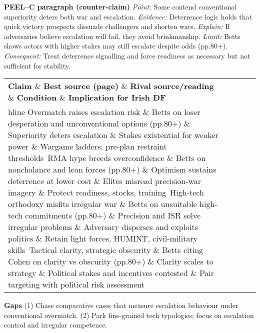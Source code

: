 \textbf{PEEL–C paragraph (counter-claim)}
\textit{Point:} Some contend conventional superiority deters both war and escalation.
\textit{Evidence:} Deterrence logic holds that quick victory prospects dissuade challengers and shorten wars.
\textit{Explain:} If adversaries believe escalation will fail, they avoid brinkmanship.
\textit{Limit:} Betts shows actors with higher stakes may still escalate despite odds (pp.80+).
\textit{Consequent:} Treat deterrence signalling and force readiness as necessary but not sufficient for stability.

  
\begin{tabular}{p{3.2cm}p{4.2cm}p{3.6cm}p{3.2cm}p{4.2cm}}
	\textbf{Claim} \& \textbf{Best source (page)} \& \textbf{Rival source/reading} \& \textbf{Condition} \& \textbf{Implication for Irish DF}\\hline
	Overmatch raises escalation risk \& Betts on loser desperation and unconventional options (pp.80+) \& Superiority deters escalation \& Stakes existential for weaker power \& Wargame ladders; pre-plan restraint thresholds\
	RMA hype breeds overconfidence \& Betts on nonchalance and lean forces (pp.80+) \& Optimism sustains deterrence at lower cost \& Elites misread precision-war imagery \& Protect readiness, stocks, training\
	High-tech orthodoxy misfits irregular war \& Betts on unsuitable high-tech commitments (pp.80+) \& Precision and ISR solve irregular problems \& Adversary disperses and exploits politics \& Retain light forces, HUMINT, civil-military skills\
	Tactical clarity, strategic obscurity \& Betts citing Cohen on clarity vs obscurity (pp.80+) \& Clarity scales to strategy \& Political stakes and incentives contested \& Pair targeting with political risk assessment\
\end{tabular}

\textbf{Gaps}
(1) Chase comparative cases that measure escalation behaviour under conventional overmatch.
(2) Park fine-grained tech typologies; focus on escalation control and irregular competence.

\parencite{BLAINEY_2003}

